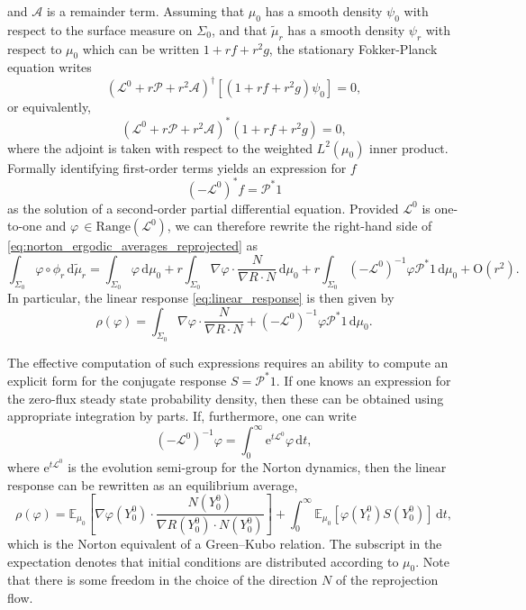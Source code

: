 \documentclass[pdflatex,sn-mathphys]{sn-jnl}%
\theoremstyle{thmstyleone}%
\theoremstyle{thmstyletwo}%
\theoremstyle{thmstylethree}%
\renewcommand{\d}{\mathrm{d}}
\newcommand{\cL}{\mathcal{L}}
\newcommand{\1}{\mathbbm{1}}
\begin{document}
and $\mathcal A$ is a remainder term.
Assuming that $\mu_0$ has a smooth density $\psi_0$ with respect to the surface measure on $\Sigma_0$, and that $\widetilde{\mu}_r$ has a smooth density $\psi_r$ with respect to $\mu_0$ which can be written $1+rf+r^2g$, the stationary Fokker-Planck equation writes 
\begin{equation}
    \left(\cL^0  + r \mathcal{P} + r^2\mathcal A\right)^\dagger\left[(1+rf+r^2g)\psi_0\right]=0,
\end{equation}
or equivalently,
\begin{equation}
    \left(\cL^0  + r \mathcal{P} + r^2\mathcal A \right)^*(1+rf+r^2g)=0,
\end{equation}
where the adjoint is taken with respect to the weighted $L^2(\mu_0)$ inner product. Formally identifying first-order terms yields an expression for $f$
\begin{equation}
    (-\cL^0)^*f=\mathcal{P}^*1
\end{equation}
as the solution of a second-order partial differential equation.
Provided $\cL^0$ is one-to-one and $\varphi\,\in \mathrm{Range}(\cL^0)$, we can therefore rewrite the right-hand side of \eqref{eq:norton_ergodic_averages_reprojected} as
\begin{equation}
    \int_{\Sigma_0}\varphi\circ \phi_{r}\,\d \widetilde{\mu}_r = \int_{\Sigma_0} \varphi \,\d \mu_0 + r\int_{\Sigma_0}\nabla \varphi \cdot \frac{N}{\nabla R\cdot N}\, \d \mu_0 + r\int_{\Sigma_0}(-\cL^0)^{-1}\varphi \mathcal{P}^*1\,\d\mu_0+\mathrm{O}(r^2).
\end{equation}
In particular, the linear response \eqref{eq:linear_response} is then given by
\[\rho(\varphi)=\int_{\Sigma_0}\nabla \varphi \cdot \frac{N}{\nabla R\cdot N} + (-\cL^0)^{-1}\varphi \mathcal{P}^*1\, \d \mu_0.\]

The effective computation of such expressions requires an ability to compute an explicit form for the conjugate response $S=\mathcal{P}^*1$. If one knows an expression for the zero-flux steady state probability density, then these can be obtained using appropriate integration by parts. If, furthermore, one can write 
\[(-\cL^0)^{-1}\varphi = \int_0^\infty \mathrm{e}^{t\cL^0}\varphi\,\d t,\]
where $\mathrm{e}^{t\cL^0}$ is the evolution semi-group for the Norton dynamics, then the linear response can be rewritten as an equilibrium average, 
\begin{equation}
\label{eq:green_kubo_relation}
    \rho(\varphi)=\mathbb{E}_{\mu_0}\left[\nabla \varphi(Y_0^0) \cdot \frac{N(Y_0^0)}{\nabla R(Y_0^0)\cdot N(Y_0^0)}\right]+\int_0^\infty \mathbb{E}_{\mu_0}\left[\varphi(Y_t^0)S(Y_0^0)\right]\,\d t,
\end{equation}
which is the Norton equivalent of a Green--Kubo relation. The subscript in the expectation denotes that initial conditions are distributed according to $\mu_0$. Note that there is some freedom in the choice of the direction $N$ of the reprojection flow. 
\end{document}
